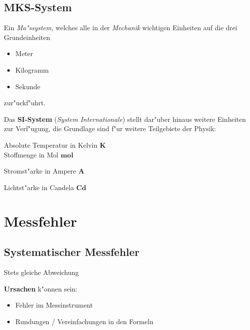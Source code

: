 \subsection{MKS-System}
\label{kap_mks-system}

\begin{Def}
   Ein \emph{Ma"ssystem}, welches alle in der \emph{Mechanik} wichtigen
   Einheiten auf die drei Grundeinheiten
   \begin{itemize}
   \item Meter
   \item Kilogramm
   \item Sekunde
   \end{itemize}
   zur"uckf"uhrt.
\end{Def}

 Das \textbf{SI-System} (\emph{System
  Internationale}) stellt dar"uber hinaus weitere Einheiten zur
Verf"ugung, die Grundlage sind f"ur weitere Teilgebiete der Physik:

\begin{description}[\setlabelstyle{\bfseries\slshape}]
\item[Thermodynamik] Absolute Temperatur in Kelvin $\mathbf
   K$\\Stoffmenge in Mol $\mathbf{mol}$
     \item[Elektrodynamik] Stromst"arke in Ampere $\mathbf A$
     \item[Optik] Lichtst"arke in Candela $\mathbf{Cd}$
 \end{description}






\section{Messfehler}

\subsection{Systematischer Messfehler}

\begin{Def}
     Stets gleiche Abweichung
\end{Def}

\textbf{Ursachen} k"onnen sein:
\begin{itemize}
     \item Fehler im Messinstrument
     \item Rundungen / Vereinfachungen in den Formeln
\end{itemize}




